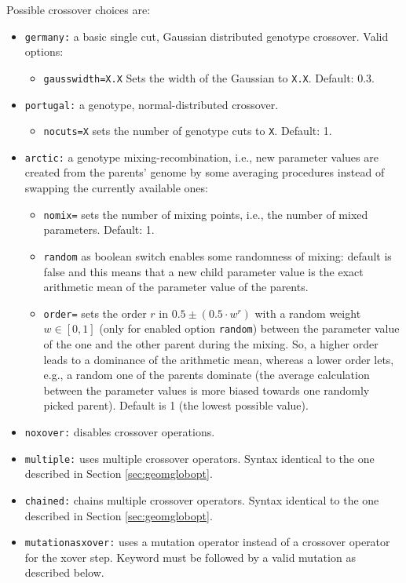 \documentclass[a4paper,10pt]{scrbook}
\begin{document}
Possible crossover choices are:
\begin{itemize}
  \item \texttt{germany:} a basic single cut, Gaussian distributed genotype 
crossover. Valid options:
  \begin{itemize}
    \item \texttt{gausswidth=X.X} Sets the width of the Gaussian to 
\texttt{X.X}. Default: 0.3.
  \end{itemize}
  \item \texttt{portugal:} a genotype, normal-distributed crossover. 
  \begin{itemize}
    \item \texttt{nocuts=X} sets the number of genotype cuts to \texttt{X}. 
Default: 1.
  \end{itemize}
  \item \texttt{arctic:} a genotype mixing-recombination, i.e., new 
  parameter values are created from the parents' genome by some averaging 
  procedures instead of swapping the currently available ones:
  \begin{itemize}
    \item \texttt{nomix=} sets the number of mixing points, i.e., the 
    number of mixed parameters. 
    Default: 1.
    \item \texttt{random} as boolean switch enables some randomness 
    of mixing: default is false and this means that a new child parameter value is 
    the exact arithmetic mean of the parameter value of the parents. 
    \item \texttt{order=} sets the order $r$ in $0.5 \pm (0.5 \cdot w^r)$ with 
    a random weight $w \in [0, 1]$ (only for enabled option \texttt{random}) 
    between the parameter value of the one and the other parent during the mixing.
    So, a higher order leads to a dominance of the arithmetic mean, whereas a lower 
    order lets, e.g., a random one of the parents dominate (the average calculation
    between the parameter values is more biased towards one randomly picked parent). 
    Default is 1 (the lowest possible value).
  \end{itemize}
  \item \texttt{noxover:} disables crossover operations.
  \item \texttt{multiple:} uses multiple crossover operators. Syntax identical 
to the one described in Section \ref{sec:geomglobopt}.
  \item \texttt{chained:} chains multiple crossover operators. Syntax identical 
to the one described in Section \ref{sec:geomglobopt}.
  \item \texttt{mutationasxover:} uses a mutation operator instead of a 
crossover operator for the xover step. Keyword must be followed by a valid 
mutation as described below.
\end{itemize}
\end{document}
